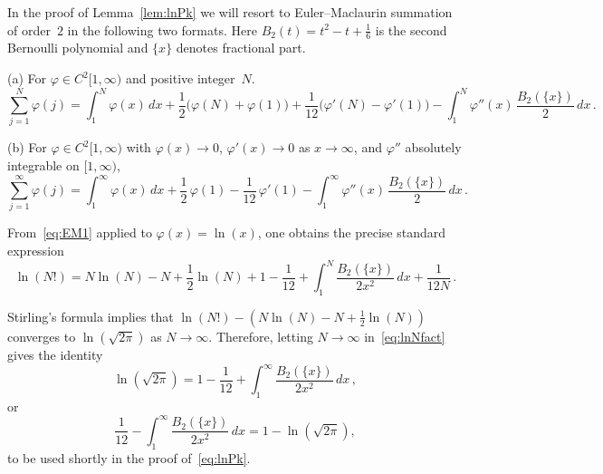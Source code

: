 \documentclass[12pt]{amsart}
\theoremstyle{definition}
\begin{document}
In the proof of Lemma~\ref{lem:lnPk} we will resort to Euler--Maclaurin summation of order~$2$ in
the following two formats. Here $B_2(t)=t^2-t+\frac{1}{6}$ is the second Bernoulli polynomial
and $\{x\}$ denotes fractional part.

\medskip

\noindent(a) For $\varphi\in C^2[1,\infty)$ and positive integer~$N$.
\begin{equation}\label{eq:EM1}
\sum_{j=1}^{N} \varphi(j) = \int_1^N \varphi(x)\, dx + \frac{1}{2}\big(\varphi(N)+\varphi(1)\big) + \frac{1}{12}\big(\varphi'(N)-\varphi'(1)\big) - \int_1^N \varphi''(x)\,\frac{B_2(\{x\})}{2}\, dx\,.
\end{equation}

\noindent(b) For $\varphi\in C^2[1,\infty)$ with $\varphi(x)\to 0$, $\varphi'(x)\to 0$ as $x\to\infty$, and $\varphi''$ absolutely
integrable on $[1,\infty)$,
\begin{equation}\label{eq:EM2}
\sum_{j=1}^{\infty} \varphi(j) = \int_1^{\infty} \varphi(x)\, dx + \frac{1}{2}\,\varphi(1) - \frac{1}{12}\,\varphi'(1) - \int_1^{\infty} \varphi''(x)\,\frac{B_2(\{x\})}{2}\, dx\,.
\end{equation}

From~\eqref{eq:EM1} applied to $\varphi(x)=\ln(x)$, one obtains the precise standard expression
\begin{equation}\label{eq:lnNfact}
\ln(N!) = N\ln(N) - N + \frac{1}{2}\ln(N) + 1 - \frac{1}{12} + \int_1^N \frac{B_2(\{x\})}{2x^2}\, dx + \frac{1}{12N}\,.
\end{equation}

Stirling's formula implies that $\ln(N!) - (N\ln(N) - N + \frac{1}{2}\ln(N))$ converges to $\ln(\sqrt{2\pi})$ as
$N\to\infty$. Therefore, letting $N\to\infty$ in~\eqref{eq:lnNfact} gives the identity
\[
\ln(\sqrt{2\pi}) = 1 - \frac{1}{12} + \int_1^{\infty} \frac{B_2(\{x\})}{2x^2}\, dx\,,
\]
or
\begin{equation}\label{eq:Stirlingidentity}
\frac{1}{12} - \int_1^{\infty} \frac{B_2(\{x\})}{2x^2}\, dx = 1 - \ln(\sqrt{2\pi}),
\end{equation}
to be used shortly in the proof of~\eqref{eq:lnPk}.
\end{document}
